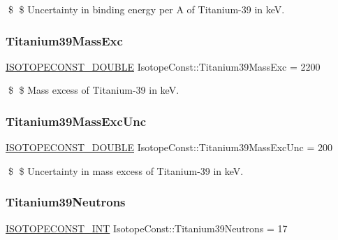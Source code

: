 \$ \$ Uncertainty in binding energy per A of Titanium-\/39 in keV. \mbox{\label{group___isotope_const-_titanium-_ti39_ga0e97c873b73c8711c5a827a9659d347b}} 
\subsubsection{\texorpdfstring{Titanium39\+Mass\+Exc}{Titanium39MassExc}}
{\footnotesize\ttfamily \mbox{\hyperlink{group___isotope_const-_macros_ga8f45a7272ce02c0b4c65c44636ed719a}{I\+S\+O\+T\+O\+P\+E\+C\+O\+N\+S\+T\+\_\+\+D\+O\+U\+B\+LE}} Isotope\+Const\+::\+Titanium39\+Mass\+Exc = 2200}

\$ \$ Mass excess of Titanium-\/39 in keV. \mbox{\label{group___isotope_const-_titanium-_ti39_ga7b498fc04b55ac82e49d4ac218939e65}} 
\subsubsection{\texorpdfstring{Titanium39\+Mass\+Exc\+Unc}{Titanium39MassExcUnc}}
{\footnotesize\ttfamily \mbox{\hyperlink{group___isotope_const-_macros_ga8f45a7272ce02c0b4c65c44636ed719a}{I\+S\+O\+T\+O\+P\+E\+C\+O\+N\+S\+T\+\_\+\+D\+O\+U\+B\+LE}} Isotope\+Const\+::\+Titanium39\+Mass\+Exc\+Unc = 200}

\$ \$ Uncertainty in mass excess of Titanium-\/39 in keV. \mbox{\label{group___isotope_const-_titanium-_ti39_gaf656f71e13461d9dcac8102d75b4697f}} 
\subsubsection{\texorpdfstring{Titanium39\+Neutrons}{Titanium39Neutrons}}
{\footnotesize\ttfamily \mbox{\hyperlink{group___isotope_const-_macros_ga5f18360b3e99483a35c32d789e62621c}{I\+S\+O\+T\+O\+P\+E\+C\+O\+N\+S\+T\+\_\+\+I\+NT}} Isotope\+Const\+::\+Titanium39\+Neutrons = 17}

